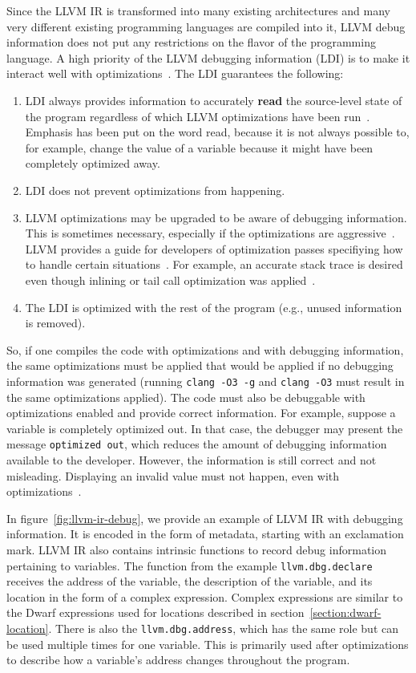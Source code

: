 Since the LLVM IR is transformed into many existing architectures and many very
different existing programming languages are compiled into it, LLVM debug
information does not put any restrictions on the flavor of the programming
language. A high priority of the LLVM debugging information (LDI) is to make it
interact well with optimizations~\cite{llvm-debug-info}. The LDI guarantees the
following:
\begin{enumerate}
    \item LDI always provides information to accurately \textbf{read} the
        source-level state of the program regardless of which LLVM
        optimizations have been run~\cite{llvm-debug-info}. Emphasis has been
        put on the word read, because it is not always possible to, for
        example, change the value of a variable because it might have been
        completely optimized away.
    \item LDI does not prevent optimizations from happening.
    \item LLVM optimizations may be upgraded to be aware of debugging
        information. This is sometimes necessary, especially if the
        optimizations are aggressive~\cite{llvm-debug-info}. LLVM provides a
        guide for developers of optimization passes specifiying how to handle
        certain situations~\cite{llvm-debug-optimizations}. For example,
        an accurate stack trace is desired even though inlining or tail call
        optimization was applied~\cite{llvm-debug-info}.
    \item The LDI is optimized with the rest of the program (e.g., unused
        information is removed).
\end{enumerate}
So, if one compiles the code with optimizations and with debugging information,
the same optimizations must be applied that would be applied if no debugging
information was generated (running \texttt{clang -O3 -g} and \texttt{clang -O3}
must result in the same optimizations applied). The code must also be
debuggable with optimizations enabled and provide correct information. For
example, suppose a variable is completely optimized out. In that case, the
debugger may present the message \texttt{optimized out}, which reduces the
amount of debugging information available to the developer. However, the
information is still correct and not misleading. Displaying an invalid value
must not happen, even with optimizations~\cite{llvm-debug-info}.

In figure~\ref{fig:llvm-ir-debug}, we provide an example of LLVM IR with
debugging information. It is encoded in the form of metadata, starting with an
exclamation mark. LLVM IR also contains intrinsic functions to record debug
information pertaining to variables. The function from the example
\texttt{llvm.dbg.declare} receives the address of the variable, the description
of the variable, and its location in the form of a complex expression. Complex
expressions are similar to the Dwarf expressions used for locations described
in section~\ref{section:dwarf-location}. There is also the
\texttt{llvm.dbg.address}, which has the same role but can be used multiple
times for one variable. This is primarily used after optimizations to describe
how a variable's address changes throughout the program.

